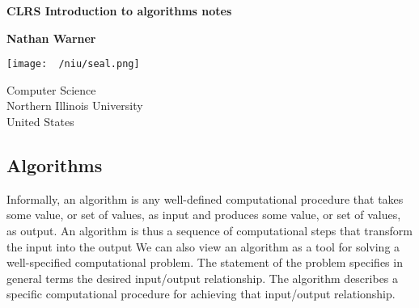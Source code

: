 \documentclass{report}
\title{\Huge{}}
\author{\huge{Nathan Warner}}
\date{\huge{}}
\begin{document}
        \begin{titlepage}
       \begin{center}
           \vspace*{1cm}
    
           \textbf{CLRS Introduction to algorithms notes}
    
           \vspace{0.5cm}
            
                
           \vspace{1.5cm}
    
           \textbf{Nathan Warner}
    
           \vfill
                
                
           \vspace{0.8cm}
         
           \texttt{[image: ~/niu/seal.png]}
                
           Computer Science \\
           Northern Illinois University\\
           United States\\
           
                
       \end{center}
    \end{titlepage}
    \tableofcontents
    \pagebreak 
    \bigbreak \noindent 
    \subsection{Algorithms}
    \bigbreak \noindent 
    Informally, an algorithm is any well-defined computational procedure that takes some value, or set of values, as input and produces some value, or set of values, as output. An algorithm is thus a sequence of computational steps that transform the input into the output
    \bigbreak \noindent 
    We can also view an algorithm as a tool for solving a well-specified computational problem. The statement of the problem specifies in general terms the desired input/output relationship. The algorithm describes a specific computational procedure for achieving that input/output relationship.
    \bigbreak \noindent 
\end{document}
